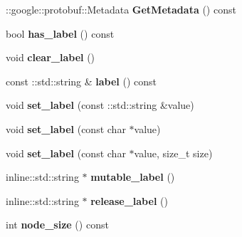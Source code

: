 \begin{DoxyCompactItemize}
\item 
\hypertarget{classgraph_1_1Graph_a768343926fbd6a32cb08ec9580a46443}{
::google::protobuf::Metadata {\bfseries GetMetadata} () const }
\label{classgraph_1_1Graph_a768343926fbd6a32cb08ec9580a46443}

\item 
\hypertarget{classgraph_1_1Graph_a8a43e784467fb4eda053810d73725508}{
bool {\bfseries has\_\-label} () const }
\label{classgraph_1_1Graph_a8a43e784467fb4eda053810d73725508}

\item 
\hypertarget{classgraph_1_1Graph_ae493d41f9b434145be083cbc2044c1d9}{
void {\bfseries clear\_\-label} ()}
\label{classgraph_1_1Graph_ae493d41f9b434145be083cbc2044c1d9}

\item 
\hypertarget{classgraph_1_1Graph_a7063c43da1905648d2948ce1c13d38ff}{
const ::std::string \& {\bfseries label} () const }
\label{classgraph_1_1Graph_a7063c43da1905648d2948ce1c13d38ff}

\item 
\hypertarget{classgraph_1_1Graph_ab04d4c18c9ab77ee27d5e66b92624bdd}{
void {\bfseries set\_\-label} (const ::std::string \&value)}
\label{classgraph_1_1Graph_ab04d4c18c9ab77ee27d5e66b92624bdd}

\item 
\hypertarget{classgraph_1_1Graph_a2e33bd3438f862850c7f2fad8bb3e544}{
void {\bfseries set\_\-label} (const char $\ast$value)}
\label{classgraph_1_1Graph_a2e33bd3438f862850c7f2fad8bb3e544}

\item 
\hypertarget{classgraph_1_1Graph_a829bbd790ed76b6b1729d4c719b413d7}{
void {\bfseries set\_\-label} (const char $\ast$value, size\_\-t size)}
\label{classgraph_1_1Graph_a829bbd790ed76b6b1729d4c719b413d7}

\item 
\hypertarget{classgraph_1_1Graph_ab3b46393b1918c6608320f57d9486f12}{
inline::std::string $\ast$ {\bfseries mutable\_\-label} ()}
\label{classgraph_1_1Graph_ab3b46393b1918c6608320f57d9486f12}

\item 
\hypertarget{classgraph_1_1Graph_a95233ad394bd217ae7b49bb4498e48f3}{
inline::std::string $\ast$ {\bfseries release\_\-label} ()}
\label{classgraph_1_1Graph_a95233ad394bd217ae7b49bb4498e48f3}

\item 
\hypertarget{classgraph_1_1Graph_a005baadb25b7b9611082a1c3f285cdfa}{
int {\bfseries node\_\-size} () const }
\label{classgraph_1_1Graph_a005baadb25b7b9611082a1c3f285cdfa}


\end{DoxyCompactItemize}
